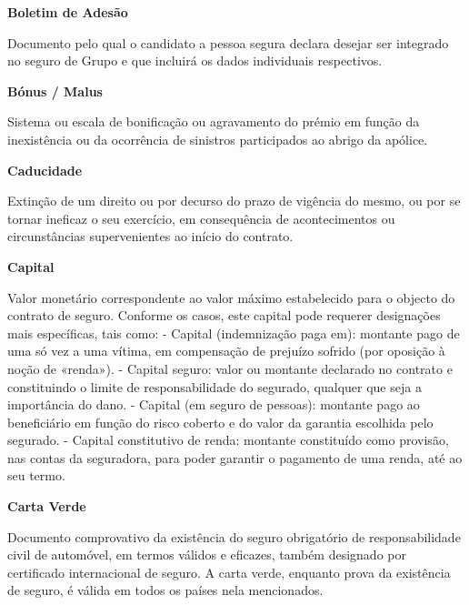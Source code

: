 \begin{description}
\item \textbf{Boletim de Adesão}

Documento pelo qual o candidato a pessoa segura declara desejar ser integrado no seguro de Grupo e que incluirá os dados individuais respectivos.
\end{description}

\begin{description}
\item \textbf{Bónus / Malus}

Sistema ou escala de bonificação ou agravamento do prémio em função da inexistência ou da ocorrência de sinistros participados ao abrigo da apólice.
\end{description}

\begin{description}
\item \textbf{Caducidade}

Extinção de um direito ou por decurso do prazo de vigência do mesmo, ou por se tornar ineficaz o seu exercício, em consequência de acontecimentos ou circunstâncias supervenientes ao início do contrato.
\end{description}

\begin{description}
\item \textbf{Capital}

Valor monetário correspondente ao valor máximo estabelecido para o objecto do contrato de seguro. Conforme os casos, este capital pode requerer designações mais específicas, tais como: - Capital (indemnização paga em): montante pago de uma só vez a uma vítima, em compensação de prejuízo sofrido (por oposição à noção de «renda»). - Capital seguro: valor ou montante declarado no contrato e constituindo o limite de responsabilidade do segurado, qualquer que seja a importância do dano. - Capital (em seguro de pessoas): montante pago ao beneficiário em função do risco coberto e do valor da garantia escolhida pelo segurado. - Capital constitutivo de renda: montante constituído como provisão, nas contas da seguradora, para poder garantir o pagamento de uma renda, até ao seu termo.\end{description}

\begin{description}
\item \textbf{Carta Verde}

Documento comprovativo da existência do seguro obrigatório de responsabilidade civil de automóvel, em termos válidos e eficazes, também designado por certificado internacional de seguro. A carta verde, enquanto prova da existência de seguro, é válida em todos os países nela mencionados.
\end{description}

